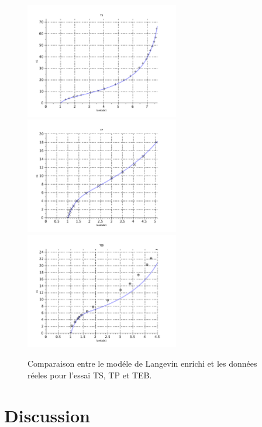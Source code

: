 \documentclass[a4paper,11pt]{article}
\begin{document}
\begin{figure}
\centering
\includegraphics[width=0.6\textwidth]{scilab_prof/q421.pdf}
\includegraphics[width=0.6\textwidth]{scilab_prof/q422.pdf}
\includegraphics[width=0.6\textwidth]{scilab_prof/q423.pdf}
\caption{Comparaison entre le modéle de Langevin enrichi et les données réeles pour l'essai TS, TP et TEB.}
\label{fig:43}
\end{figure}

\section{Discussion}
\end{document}
